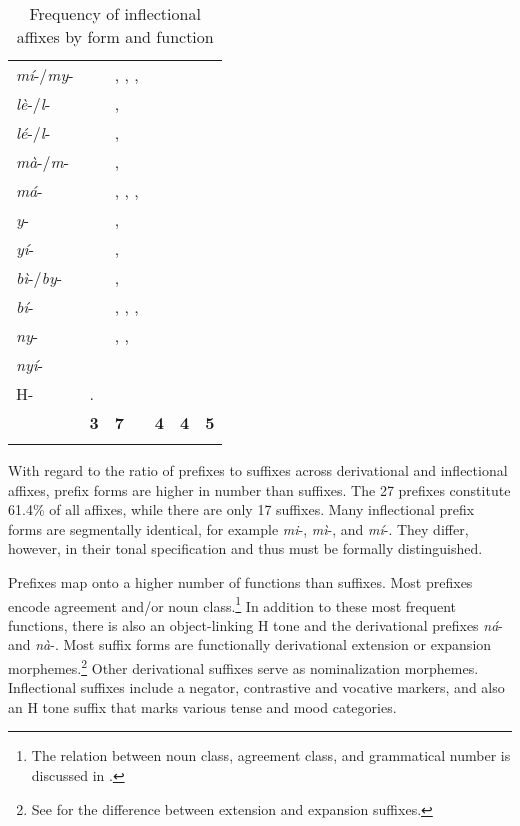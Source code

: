\begin{table}
{\begin{tabular}{lll lll}
	{\itshape mí}-/{\itshape my}-	& {\AGR} & {\POSS}, {\ANA},   {\NUM}, {\GEN}	& &  		& 		\\
	{\itshape lè}-/{\itshape l}-		& {\AGR} & {\OBJ},  {\MOD}	& &  	& 	\\
	{\itshape lé}-/{\itshape l}- 	& {\AGR} & {\POSS},  {\ANA}	& &  		& 			\\
	{\itshape mà}-/{\itshape m}-		& {\AGR} & {\OBJ}, {\MOD} & &  	& 	\\
	{\itshape má}-		& {\AGR} & {\POSS}, {\ANA}, {\NUM}, {\GEN} 		& &  		& 	 		\\
	{\itshape y}-		& {\AGR} & {\OBJ}, {\MOD}	& &  		& 		\\
	{\itshape yí}-		& {\AGR} & {\POSS}, {\ANA}	& &  		& 			\\
	{\itshape bì}-/{\itshape by}- & {\AGR} & {\OBJ}, {\MOD} & &  		& 	\\
	{\itshape bí}-		& {\AGR} & {\POSS}, {\ANA}, {\NUM}, {\GEN} 			& &  		& 			\\
	{\itshape ny}-		& {\AGR} & {\OBJ}, {\POSS}, {\MOD}	& &  		& 			\\
	{\itshape nyí}-		& {\AGR} & {\ANA}	& &  		& 			\\
	H-		& {\OBJ}.{\LINK} & {\N} 			& &  		& 			\\
 \midrule 
\raggedleft {\bfseries Total: 25} &  {\bfseries 3}	&  {\bfseries 7}&  {\bfseries 4} &   {\bfseries 4} &  {\bfseries 5}	\\
 \lspbottomrule
 \end{tabular}}
\caption{Frequency of inflectional affixes by form and function}
\label{Tab:AffixInflect}
\end{table} 


With regard to the ratio of prefixes to suffixes across derivational and inflectional affixes, prefix forms are higher in number than suffixes. The 27 prefixes constitute 61.4\% of all affixes, while there are only 17 suffixes. Many inflectional prefix forms are segmentally identical, for example {\itshape mi}-, {\itshape mì}-, and {\itshape mí}-. They differ, however, in their tonal specification and thus must  be formally distinguished.


Prefixes map onto a higher number of functions than suffixes.  Most prefixes encode agreement and/or noun class.\footnote{The relation between noun class, agreement class, and grammatical number is discussed in .} In addition to these most frequent functions, there is also an object-linking H tone and the derivational prefixes {\itshape ná}- and {\itshape nà}-. 
Most suffix forms are functionally derivational extension or expansion morphemes.\footnote{See  for the difference between extension and expansion suffixes.} Other derivational suffixes serve as nominalization morphemes. Inflectional suffixes include a negator, contrastive and vocative markers, and also an H tone suffix that marks various tense and mood categories. 

